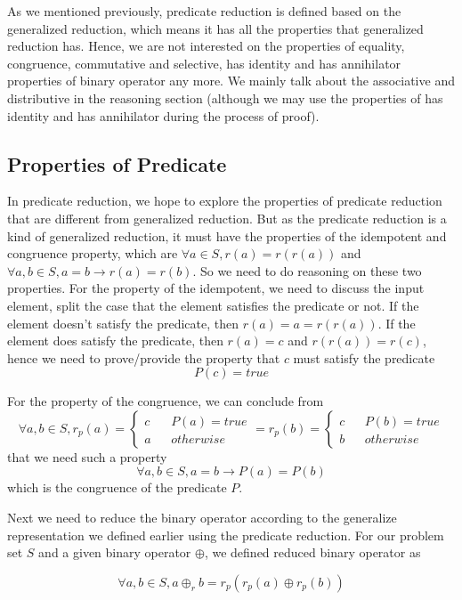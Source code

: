 \documentclass[a4paper,10pt]{article}
\newcommand{\e}[2]{
\begin{equation}
  \label{#1} 
  #2
\end{equation}
}
\begin{document}
As we mentioned previously, predicate reduction is defined based on the generalized reduction, which means it has all the properties that generalized reduction has. Hence, we are not interested on the properties of equality, congruence, commutative and selective, has identity and has annihilator properties of binary operator any more. We mainly talk about the associative and distributive in the reasoning section (although we may use the properties of has identity and has annihilator during the process of proof).

\subsection{Properties of Predicate}
In predicate reduction, we hope to explore the properties of predicate reduction that are different from generalized reduction.
But as the predicate reduction is a kind of generalized reduction, it must have the properties of the idempotent and congruence property, which are $\forall a \in S, r(a) = r(r(a))$ and $\forall a,b\in S, a = b \rightarrow r(a) = r(b)$. So we need to do reasoning on these two properties. For the property of the idempotent, we need to discuss the input element, split the case that the element satisfies the predicate or not. If the element doesn't satisfy the predicate, then $r(a) = a = r(r(a))$. If the element does satisfy the predicate, then $r(a) = c$ and $r(r(a)) = r(c)$, hence we need to prove/provide the property that $c$ must satisfy the predicate \e{pr:proof:p_true}{P(c) = true}
For the property of the congruence, we can conclude from 
\[\forall a,b \in S, r_p(a)=\left\{
\begin{aligned}
c &  & P(a) = true \\
a &  & otherwise 
\end{aligned}
\right. = 
r_p(b)=\left\{
\begin{aligned}
c &  & P(b) = true \\
b &  & otherwise 
\end{aligned}
\right.\] that we need such a property \e{pr:proof:p_cong}{\forall a,b \in S, a = b \rightarrow P(a) = P(b)} which is the congruence of the predicate $P$.

Next we need to reduce the binary operator according to the generalize representation we defined earlier using the predicate reduction. For our problem set $S$ and a given binary operator $\oplus$, we defined reduced binary operator as 
\e{pr:def:binary_operator}{\forall a,b \in S, a \oplus_r b = r_p (r_p(a) \oplus r_p(b))}
\end{document}
